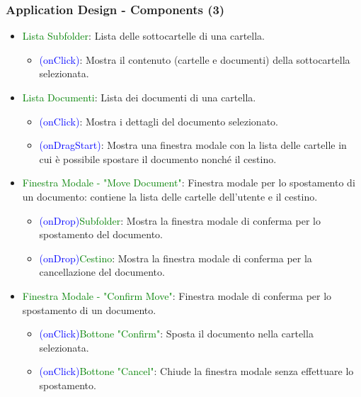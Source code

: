 \documentclass[aspectratio=169, dvipsnames]{beamer}
\begin{document}
\begin{frame}
    \frametitle{Application Design - Components (3)}
    \begin{itemize}
        \item \textcolor{Green}{Lista Subfolder}: Lista delle sottocartelle di una cartella.
              \begin{itemize}
                  \item \textcolor{Blue}{(onClick)}: Mostra il contenuto (cartelle e documenti) della
                        sottocartella selezionata.
              \end{itemize}

        \item \textcolor{Green}{Lista Documenti}: Lista dei documenti di una cartella.
              \begin{itemize}
                  \item \textcolor{Blue}{(onClick)}: Mostra i dettagli del documento selezionato.
                  \item \textcolor{Blue}{(onDragStart)}: Mostra una finestra modale con la lista delle cartelle
                        in cui è possibile spostare il documento nonché il cestino.
              \end{itemize}

        \item \textcolor{Green}{Finestra Modale - "Move Document"}: Finestra modale per lo spostamento di un documento:
              contiene la lista delle cartelle dell'utente e il cestino.
              \begin{itemize}
                  \item \textcolor{Blue}{(onDrop)}\textrightarrow \textcolor{Green}{Subfolder}:
                        Mostra la finestra modale di conferma per lo spostamento del documento.
                  \item \textcolor{Blue}{(onDrop)}\textrightarrow \textcolor{Green}{Cestino}:
                        Mostra la finestra modale di conferma per la cancellazione del documento.
              \end{itemize}

        \item \textcolor{Green}{Finestra Modale - "Confirm Move"}: Finestra modale di conferma per lo spostamento
              di un documento.
              \begin{itemize}
                  \item \textcolor{Blue}{(onClick)}\textrightarrow \textcolor{Green}{Bottone "Confirm"}:
                        Sposta il documento nella cartella selezionata.
                  \item \textcolor{Blue}{(onClick)}\textrightarrow \textcolor{Green}{Bottone "Cancel"}:
                        Chiude la finestra modale senza effettuare lo spostamento.
              \end{itemize}
    \end{itemize}
\end{frame}
\end{document}
